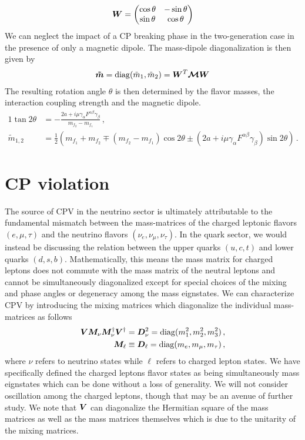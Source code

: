 \begin{alignat}{1}
	\label{mix:eq:04} \boldsymbol{W} = 
	\begin{pmatrix}
		\cos{\theta} & -\sin{\theta}\\
		\sin{\theta} & \cos{\theta}
	\end{pmatrix}
\end{alignat}
We can neglect the impact of a CP breaking phase in the two-generation case in the presence of only a magnetic dipole. The mass-dipole diagonalization is then given by
\begin{alignat}{1}
	\label{mix:eq:05} \boldsymbol{\tilde{m}} = \mathrm{diag}(\tilde{m}_{1},\tilde{m}_{2})=\boldsymbol{W}^{T}\boldsymbol{\mathcal{M}}\boldsymbol{W}
\end{alignat}
The resulting rotation angle $\theta$ is then determined by the flavor masses, the interaction coupling strength and the magnetic dipole. 
\begin{alignat}{1}
	\label{mix:eq:06a} \tan{2\theta}&=-\frac{2a+i\mu\gamma_{\alpha}F^{\alpha\beta}\gamma_{\beta}}{m_{f_{2}}-m_{f_{1}}}\,,\\
	\label{mix:eq:06b} \tilde{m}_{1,2}&=\frac{1}{2}\left(m_{f_{1}}+m_{f_{2}}\mp(m_{f_{2}}-m_{f_{1}})\cos{2\theta}\pm(2a+i\mu\gamma_{\alpha}F^{\alpha\beta}\gamma_{\beta})\sin{2\theta}\right)\,.
\end{alignat}
\section{CP violation}
The source of CPV in the neutrino sector is ultimately attributable to the fundamental mismatch between the mass-matrices of the charged leptonic flavors $(e,\mu,\tau)$ and the neutrino flavors $(\nu_{e},\nu_{\mu},\nu_{\tau})$. \cite{schwartz2014quantum} In the quark sector, we would instead be discussing the relation between the upper quarks $(u,c,t)$ and lower quarks $(d,s,b)$. Mathematically, this means the mass matrix for charged leptons does not commute with the mass matrix of the neutral leptons and cannot be simultaneously diagonalized except for special choices of the mixing and phase angles or degeneracy among the mass eignstates. \ar We can characterize CPV by introducing the mixing matrices which diagonalize the individual mass-matrices as follows
\begin{alignat}{1}
	\label{diag:1} \boldsymbol{V}\boldsymbol{M}_{\nu}\boldsymbol{M}_{\nu}^{\dagger}\boldsymbol{V}^{\dagger} = \boldsymbol{D}_{\nu}^{2} = \mathrm{diag}(m_{1}^{2},m_{2}^{2},m_{3}^{2})\,,\\
    \label{diag:2} \boldsymbol{M}_{\ell} \equiv \boldsymbol{D}_{\ell} = \mathrm{diag}(m_{e},m_{\mu},m_{\tau})\,,
\end{alignat}
where $\nu$ refers to neutrino states while $\ell$ refers to charged lepton states. We have specifically defined the charged leptons flavor states as being simultaneously mass eignstates which can be done without a loss of generality. We will not consider oscillation among the charged leptons, though that may be an avenue of further study. \cite{akhmedov2007charged} We note that $\boldsymbol{V}$ can diagonalize the Hermitian square of the mass matrices as well as the mass matrices themselves which is due to the unitarity of the mixing matrices.

